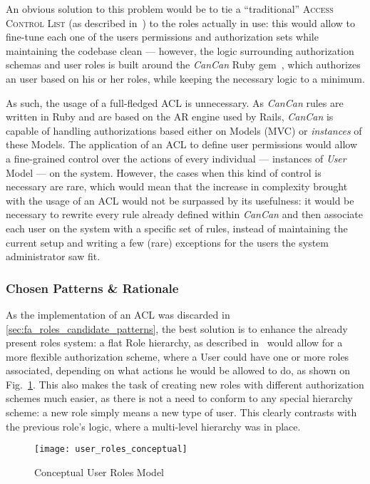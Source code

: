An obvious solution to this problem would be to tie a ``traditional'' \textsc{Access Control List} (as described in~\cite{acls}) to the roles actually in use: this would allow to fine-tune each one of the users permissions and authorization sets while maintaining the codebase clean --- however, the logic surrounding authorization schemas and user roles is built around the \emph{CanCan} Ruby gem~\cite{cancan}, which authorizes an user based on his or her roles, while keeping the necessary logic to a minimum.

As such, the usage of a full-fledged ACL is unnecessary. As \emph{CanCan} rules are written in Ruby and are based on the AR engine used by Rails, \emph{CanCan} is capable of handling authorizations based either on Models (MVC) or \emph{instances} of these Models. The application of an ACL to define user permissions would allow a fine-grained control over the actions of every individual --- instances of \emph{User} Model --- on the system. However, the cases when this kind of control is necessary are rare, which would mean that the increase in complexity brought with the usage of an ACL would not be surpassed by its usefulness: it would be necessary to rewrite every rule already defined within \emph{CanCan} and then associate each user on the system with a specific set of rules, instead of maintaining the current setup and writing a few (rare) exceptions for the users the system administrator saw fit.

\subsubsection{Chosen Patterns \& Rationale}\label{sec:fa_roles_chosen_patterns_rationale}

As the implementation of an ACL was discarded in \ref{sec:fa_roles_candidate_patterns}, the best solution is to enhance the already present roles system: a flat Role hierarchy, as described in~\cite{baumer_riehle_role_object} would allow for a more flexible authorization scheme, where a User could have one or more roles associated, depending on what actions he would be allowed to do, as shown on Fig.~\ref{fig:user_roles_conceptual}. This also makes the task of creating new roles with different authorization schemes much easier, as there is not a need to conform to any special hierarchy scheme: a new role simply means a new type of user. This clearly contrasts with the previous role's logic, where a multi-level hierarchy was in place.

\begin{figure}[H]
  \centering
  \texttt{[image: user\_roles\_conceptual]}
  \caption{Conceptual User Roles Model}
  \label{fig:user_roles_conceptual}
\end{figure}

